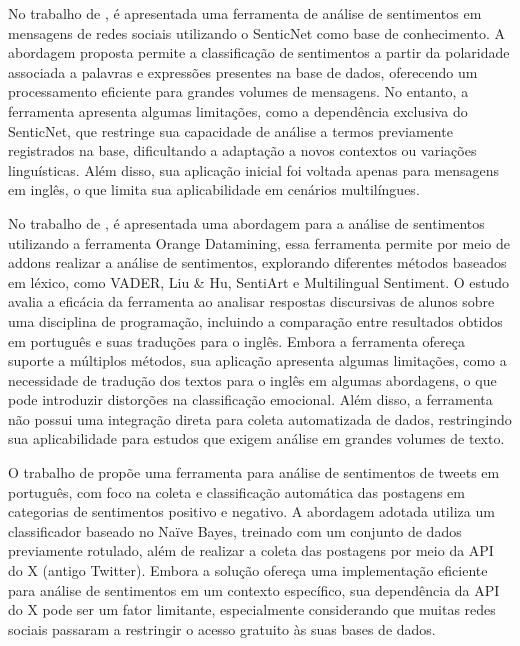 \documentclass[
	12pt,				%
	oneside,			%
	a4paper,			%
	english,			%
	french,				%
	spanish,			%
	brazil				%
	]{abntex2}
\begin{document}
No trabalho de , é apresentada uma
ferramenta de análise de sentimentos em mensagens de redes sociais
utilizando o SenticNet como base de conhecimento. A abordagem proposta
permite a classificação de sentimentos a partir da polaridade associada
a palavras e expressões presentes na base de dados, oferecendo um
processamento eficiente para grandes volumes de mensagens. No entanto, a
ferramenta apresenta algumas limitações, como a dependência exclusiva do
SenticNet, que restringe sua capacidade de análise a termos previamente
registrados na base, dificultando a adaptação a novos contextos ou
variações linguísticas. Além disso, sua aplicação inicial foi voltada
apenas para mensagens em inglês, o que limita sua aplicabilidade em
cenários multilíngues.

No trabalho de , é apresentada uma
abordagem para a análise de sentimentos utilizando a ferramenta Orange
Datamining, essa ferramenta permite por meio de addons realizar a
análise de sentimentos, explorando diferentes métodos baseados em
léxico, como VADER, Liu \& Hu, SentiArt e Multilingual Sentiment. O
estudo avalia a eficácia da ferramenta ao analisar respostas discursivas
de alunos sobre uma disciplina de programação, incluindo a comparação
entre resultados obtidos em português e suas traduções para o inglês.
Embora a ferramenta ofereça suporte a múltiplos métodos, sua aplicação
apresenta algumas limitações, como a necessidade de tradução dos textos
para o inglês em algumas abordagens, o que pode introduzir distorções na
classificação emocional. Além disso, a ferramenta não possui uma
integração direta para coleta automatizada de dados, restringindo sua
aplicabilidade para estudos que exigem análise em grandes volumes de
texto.

O trabalho de  propõe uma ferramenta para
análise de sentimentos de tweets em português, com foco na coleta e
classificação automática das postagens em categorias de sentimentos
positivo e negativo. A abordagem adotada utiliza um classificador
baseado no Naïve Bayes, treinado com um conjunto de dados previamente
rotulado, além de realizar a coleta das postagens por meio da API do X
(antigo Twitter). Embora a solução ofereça uma implementação eficiente
para análise de sentimentos em um contexto específico, sua dependência
da API do X pode ser um fator limitante, especialmente considerando que
muitas redes sociais passaram a restringir o acesso gratuito às suas
bases de dados.
\end{document}
